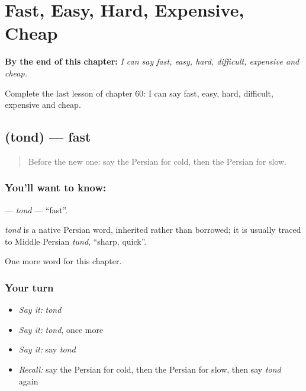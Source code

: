 
\chapter{Fast, Easy, Hard, Expensive, Cheap}
\label{ch:fa-fast-easy-hard-expensive-cheap}

\begin{chapteropening}
\textbf{By the end of this chapter:} \emph{I can say fast, easy, hard, difficult, expensive and cheap.}

Complete the last lesson of chapter 60: I can say fast, easy, hard, difficult, expensive and cheap.
\end{chapteropening}

\section[\texorpdfstring{\fa{تند} (tond)}{تند (tond)}]{ (tond) — fast}

\label{lesson:FA-C60-tond}



\begin{quote}
Before the new one: say the Persian for cold, then the Persian for slow.
\end{quote}

\subsection*{You'll want to know: }
\textbf{} — \emph{tond} — \textquotedblleft{}fast\textquotedblright{}.

\begin{cousinweb}
\emph{tond} is a native Persian word, inherited rather than borrowed; it is usually traced to Middle Persian \emph{tund}, \textquotedblleft{}sharp, quick\textquotedblright{}.
\end{cousinweb}

\begin{grammarlens}[title={What you've built}]
One more word for this chapter.
\end{grammarlens}

\subsection*{Your turn}
\begin{itemize}
\raggedright
  \item \emph{Say it:} \emph{tond}
  \item \emph{Say it:} \emph{tond}, once more
  \item \emph{Say it:} say \emph{tond}
  \item \emph{Recall:} say the Persian for cold, then the Persian for slow, then say \emph{tond} again
\end{itemize}

